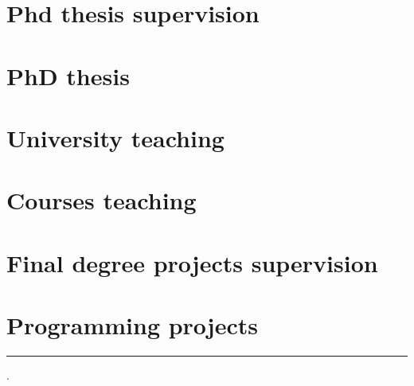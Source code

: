 \documentclass{article}
\begin{document}
\renewcommand{\refname}{}
\section{Phd thesis supervision}


\section{PhD thesis}


\section{University teaching}


\renewcommand{\refname}{}
\section{Courses teaching}


\renewcommand{\refname}{}
\section{Final degree projects supervision}


%

\renewcommand{\refname}{}
\section{Programming projects}


\hrule
\currenttime.
\end{document}
